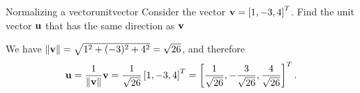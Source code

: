 \begin{example}{Normalizing a vector}{unitvector}
  Consider the vector $\mbox{\bf v} = \left[1, -3, 4\right]^T$. Find the unit
  vector $\mbox{\bf u}$ that has the same direction as $\mbox{\bf v}$
\end{example}

\begin{solution}
  We have $\left\|\mbox{\bf v}\right\| = \sqrt{ 1^2 + (-3)^2 + 4^2} =
  \sqrt{26}$, and therefore
  \begin{equation*}
    \mbox{\bf u}
    = \frac{1}{\left\|\mbox{\bf v}\right\|} \mbox{\bf v}
    = \frac{1}{\sqrt{26}} \left[1, -3, 4\right]^T
    = \left[\frac{1}{\sqrt{26}}, -\frac{3}{\sqrt{26}}, \frac{4}{\sqrt{26}}\right]^T.
  \end{equation*}
\end{solution}

